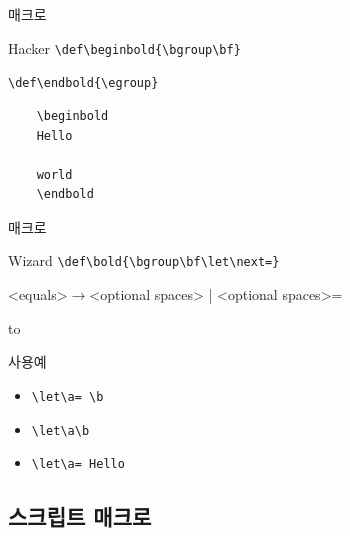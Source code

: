 \documentclass{beamer}
\begin{document}
%
\begin{frame}[fragile]{\texttt{\string\bold} 매크로}
  \begin{alertblock}{Hacker}
    \verb+\def\beginbold{\bgroup\bf}+
    
    \verb+\def\endbold{\egroup}+
  \end{alertblock}

  \begin{verbatim}
    \beginbold
    Hello

    world
    \endbold
  \end{verbatim}
\end{frame}


%
\begin{frame}[fragile]{\texttt{\string\bold} 매크로}
  \begin{alertblock}{Wizard}
    \verb+\def\bold{\bgroup\bf\let\next=}+
  \end{alertblock}
  \medskip
  <equals>$\rightarrow$<optional spaces> | <optional spaces>=
  
  \hbox to
  \medskip

  \begin{alertblock}{사용예}
    \begin{itemize}
    \item \verb*+\let\a= \b+
    \item \verb*+\let\a\b+
    \item \verb*+\let\a= Hello+
    \end{itemize}
  \end{alertblock}
\end{frame}


%


\subsection{스크립트 매크로}

%
\newcount\spk
\def\beginscript{\bgroup \parindent=0pt \rm \spk=1 \rightskip.4in
  \def\par{\ifnum\spk=1 \endgraf \sl \spk=2 \leftskip.4in \rightskip0in
    \else \endgraf \rm \spk=1 \leftskip0in \rightskip.4in \fi}}
\def\endscript {\egroup}
\end{document}

